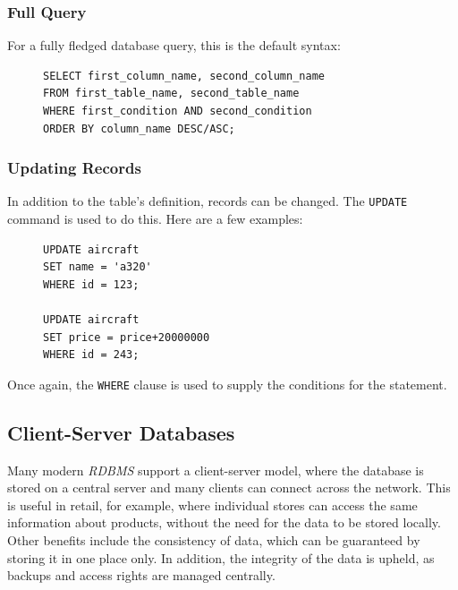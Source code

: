 \documentclass[10pt]{article}
\begin{document}
\subsubsection{Full Query}
\label{sec:orge4b4922}

For a fully fledged database query, this is the default syntax:

\begin{figure}[H]
\begin{verbatim}
SELECT first_column_name, second_column_name
FROM first_table_name, second_table_name
WHERE first_condition AND second_condition
ORDER BY column_name DESC/ASC;
\end{verbatim}
\end{figure}

\subsubsection{Updating Records}
\label{sec:org1390548}

In addition to the table's definition, records can be changed. The \texttt{UPDATE} command is used to do this. Here are a few examples:

\begin{figure}[H]
\begin{verbatim}
UPDATE aircraft
SET name = 'a320'
WHERE id = 123;

UPDATE aircraft
SET price = price+20000000
WHERE id = 243;
\end{verbatim}
\end{figure}

Once again, the \texttt{WHERE} clause is used to supply the conditions for the statement.

\subsection{Client-Server Databases}
\label{sec:orge673c65}

Many modern \emph{RDBMS} support a client-server model, where the database is stored on a central server and many clients can connect across the network. This is useful in retail, for example, where individual stores can access the same information about products, without the need for the data to be stored locally. Other benefits include the consistency of data, which can be guaranteed by storing it in one place only. In addition, the integrity of the data is upheld, as backups and access rights are managed centrally.
\end{document}
